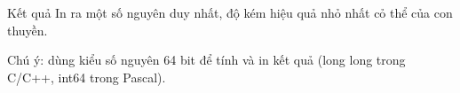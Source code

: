 Kết quả
In ra một số nguyên duy nhất, độ kém hiệu quả nhỏ nhất cỏ thể của con thuyền.  

   Chú ý: dùng kiểu số nguyên 64 bit để tính và in kết quả (long long trong C/C++, int64 trong Pascal).